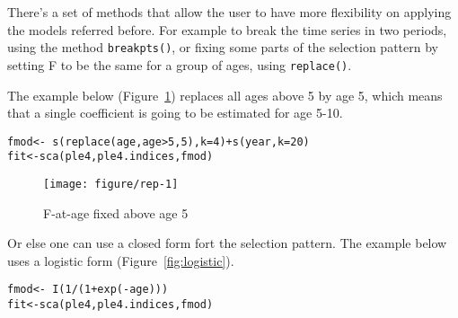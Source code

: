 \documentclass[a4paper,english,10pt]{article}\usepackage[]{graphicx}\usepackage[]{color}
\makeatletter
\def\maxwidth{ %
  \ifdim\Gin@nat@width>\linewidth
    \linewidth
  \else
    \Gin@nat@width
  \fi
}
\newcommand{\hlnum}[1]{\textcolor[rgb]{0.2,0.2,0.2}{#1}}%
\newcommand{\hlopt}[1]{\textcolor[rgb]{0.2,0.2,0.2}{#1}}%
\newcommand{\hlstd}[1]{\textcolor[rgb]{0,0,0}{#1}}%
\newcommand{\hlkwb}[1]{\textcolor[rgb]{0.361,0.506,0.596}{#1}}%
\newcommand{\hlkwc}[1]{\textcolor[rgb]{0.361,0.506,0.596}{#1}}%
\newcommand{\hlkwd}[1]{\textcolor[rgb]{0.361,0.506,0.596}{#1}}%
\newenvironment{kframe}{%
 \def\at@end@of@kframe{}%
 \ifinner\ifhmode%
  \def\at@end@of@kframe{\end{minipage}}%
  \begin{minipage}{\columnwidth}%
 \fi\fi%
 \def\FrameCommand##1{\hskip\@totalleftmargin \hskip-\fboxsep
 \colorbox{shadecolor}{##1}\hskip-\fboxsep
     \hskip-\linewidth \hskip-\@totalleftmargin \hskip\columnwidth}%
 \MakeFramed {\advance\hsize-\width
   \@totalleftmargin\z@ \linewidth\hsize
   \@setminipage}}%
 {\par\unskip\endMakeFramed%
 \at@end@of@kframe}
\newenvironment{knitrout}{}{} %
\newcommand{\code}[1]{{\texttt{#1}}}
\makeatother
\begin{document}
There's a set of methods that allow the user to have more flexibility on applying the models referred before. For example to break the time series in two periods, using the method \code{breakpts()}, or fixing some parts of the selection pattern by setting F to be the same for a group of ages, using \code{replace()}.

The example below (Figure~\ref{fig:rep}) replaces all ages above 5 by age 5, which means that a single coefficient is going to be estimated for age 5-10.

\begin{knitrout}
\color{fgcolor}\begin{kframe}
\begin{alltt}
\hlstd{fmod} \hlkwb{<-} \hlopt{~} \hlkwd{s}\hlstd{(}\hlkwd{replace}\hlstd{(age, age}\hlopt{>}\hlnum{5}\hlstd{,} \hlnum{5}\hlstd{),} \hlkwc{k}\hlstd{=}\hlnum{4}\hlstd{)} \hlopt{+} \hlkwd{s}\hlstd{(year,} \hlkwc{k}\hlstd{=}\hlnum{20}\hlstd{)}
\hlstd{fit} \hlkwb{<-} \hlkwd{sca}\hlstd{(ple4, ple4.indices, fmod)}
\end{alltt}
\end{kframe}
\end{knitrout}

\begin{knitrout}
\color{fgcolor}\begin{figure}[H]

{\centering \texttt{[image: figure/rep-1]} 

}

\caption[F-at-age fixed above age 5]{F-at-age fixed above age 5\label{fig:rep}}
\end{figure}


\end{knitrout}

Or else one can use a closed form fort the selection pattern. The example below uses a logistic form (Figure~\ref{fig:logistic}).

\begin{knitrout}
\color{fgcolor}\begin{kframe}
\begin{alltt}
\hlstd{fmod} \hlkwb{<-} \hlopt{~} \hlkwd{I}\hlstd{(}\hlnum{1}\hlopt{/}\hlstd{(}\hlnum{1}\hlopt{+}\hlkwd{exp}\hlstd{(}\hlopt{-}\hlstd{age)))}
\hlstd{fit} \hlkwb{<-} \hlkwd{sca}\hlstd{(ple4, ple4.indices, fmod)}
\end{alltt}
\end{kframe}
\end{knitrout}
\end{document}
